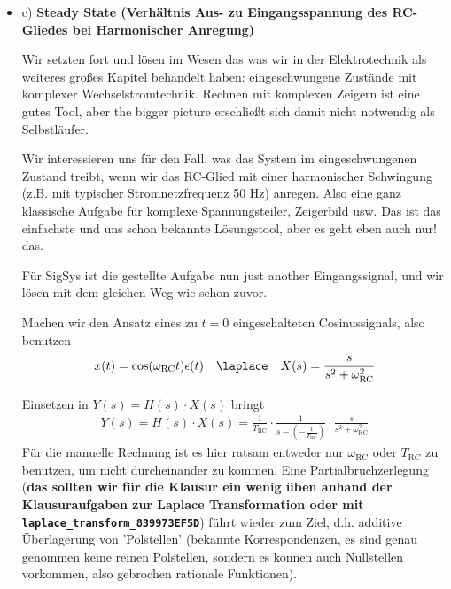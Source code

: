 \begin{Loesung}
\begin{itemize}
\item c) \textbf{Steady State (Verhältnis Aus- zu Eingangsspannung des
RC-Gliedes bei Harmonischer Anregung)}

Wir setzten fort und lösen im Wesen das was wir in der Elektrotechnik als weiteres großes
Kapitel behandelt haben: eingeschwungene Zustände mit komplexer Wechselstromtechnik.
Rechnen mit komplexen Zeigern ist eine gutes Tool, aber the bigger picture erschließt
sich damit nicht notwendig als Selbstläufer.

Wir interessieren uns für den Fall, was das System im eingeschwungenen Zustand
treibt, wenn wir das RC-Glied mit einer harmonischer Schwingung (z.B. mit typischer
Stromnetzfrequenz 50 Hz) anregen.
Also eine ganz klassische Aufgabe für komplexe Spannungsteiler, Zeigerbild usw.
Das ist das einfachste und uns schon bekannte Lösungstool, aber es geht eben auch
nur! das.

Für SigSys ist die gestellte Aufgabe nun just another Eingangssignal, und wir lösen
mit dem gleichen Weg wie schon zuvor.

Machen wir den Ansatz eines zu $t=0$ eingeschalteten Cosinussignals, also benutzen
\begin{equation}
x(t)=\cos(\omega_\mathrm{RC} t ) \epsilon(t) \quad \laplace \quad X(s)=\frac{s}{s^2+\omega_\mathrm{RC}^2}
\end{equation}

Einsetzen in $Y(s) = H(s)\cdot X(s)$ bringt
%
\begin{align}
Y(s) = H(s) \cdot X(s) = \frac{1}{T_\mathrm{RC}} \cdot \frac{1}{s - (-\frac{1}{T_\mathrm{RC}})} \cdot \frac{s}{s^2+\omega_\mathrm{RC}^2}
\end{align}
Für die manuelle Rechnung ist es hier ratsam entweder nur $\omega_\mathrm{RC}$ oder
$T_\mathrm{RC}$ zu benutzen, um nicht durcheinander zu kommen.
%
Eine Partialbruchzerlegung (\textbf{das sollten wir für die Klausur ein wenig üben
anhand der Klausuraufgaben zur Laplace Transformation oder mit
\texttt{laplace\_transform\_839973EF5D}})
 führt wieder zum Ziel, d.h. additive Überlagerung von
'Polstellen' (bekannte Korrespondenzen, es sind genau genommen keine reinen Polstellen,
sondern es können auch Nullstellen vorkommen, also gebrochen rationale Funktionen).


\end{itemize}
\end{Loesung}
